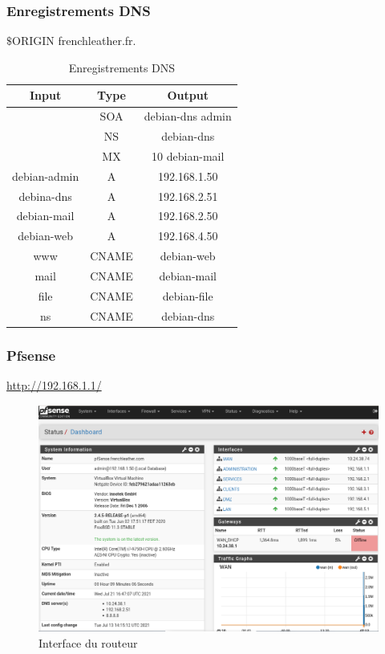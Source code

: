 \documentclass{beamer}
\begin{document}
		\begin{frame}
			\frametitle{Enregistrements DNS}
			$\$$ORIGIN frenchleather.fr.
			\begin{center}
				\begin{table}[h!]
					\centering
					\begin{tabular}{||c c c||}
						\hline
						Input & Type & Output \\
						\hline\hline
						 & SOA & debian-dns admin \\
						 & NS & debian-dns \\
						 & MX & 10 debian-mail \\
						debian-admin & A & 192.168.1.50 \\
						debina-dns & A & 192.168.2.51 \\
						debian-mail & A & 192.168.2.50 \\
						debian-web & A & 192.168.4.50 \\
						www & CNAME & debian-web \\
						mail & CNAME & debian-mail \\
						file & CNAME & debian-file \\
						ns & CNAME & debian-dns \\
						\hline
					\end{tabular}
					\caption{Enregistrements DNS}
					\label{table:1}
					\end{table}
			\end{center}
		\end{frame}
		\begin{frame}
			\frametitle{Pfsense}
			\url{http://192.168.1.1/}
			\begin{center}
				\begin{figure}
					\includegraphics[scale=.22]{pfsense.png}
					\caption{Interface du routeur}
				\end{figure}
			\end{center}
		\end{frame}
\end{document}
